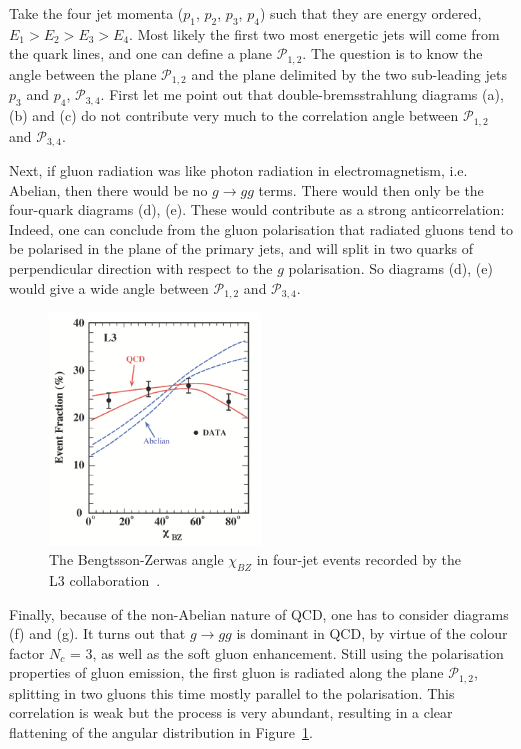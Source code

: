 Take the four jet momenta ($p_1$, $p_2$, $p_{3}$, $p_4$) such that
they are energy ordered, $E_1 > E_2 > E_3 > E_4$. Most
likely the first two most energetic jets will come from the
quark lines, and one can define a plane $\mathcal{P}_{1,2}$. The question
is to know the angle between the plane $\mathcal{P}_{1,2}$ and the
plane delimited by the two sub-leading jets $p_3$ and $p_4$,
$\mathcal{P}_{3,4}$. First let me point out that double-bremsstrahlung diagrams (a), (b) and
(c) do not contribute very much to the correlation angle between
$\mathcal{P}_{1,2}$ and $\mathcal{P}_{3,4}$. 

Next, if gluon
radiation was like photon radiation in electromagnetism, i.e. Abelian,
then there would be no $g\to gg$ terms. There would then only be the
four-quark diagrams (d), (e). These would contribute as a
strong anticorrelation: Indeed, one can conclude from the gluon
polarisation that radiated gluons tend to be polarised in the plane
of the primary jets, and will split in two quarks of perpendicular
direction with respect to the $g$ polarisation. So diagrams (d), (e)
would give a wide angle between $\mathcal{P}_{1,2}$ and
$\mathcal{P}_{3,4}$. 


\begin{figure}
\begin{center}
  \includegraphics[width=0.5\textwidth]{Chapters/pQCD/xbz.png}
 \caption{The Bengtsson-Zerwas angle $\chi_{BZ}$ in four-jet events recorded by
   the L3 collaboration~\cite{xbz_l3}.}
 \label{fig:xbz}
\end{center}
\end{figure}


Finally, because of the non-Abelian nature of QCD, one has to consider
diagrams (f) and (g). It turns out that $g \to gg$ is dominant in QCD, by
virtue of the colour factor $N_{c}$ = 3, as well as the soft gluon
enhancement. Still using the
polarisation properties of gluon emission, the first gluon is radiated
along the plane $\mathcal{P}_{1,2}$, splitting in two gluons this time
mostly parallel to the polarisation. This correlation is weak but the
process is very abundant, resulting in a clear flattening of the
angular distribution in Figure~\ref{fig:xbz}. 

